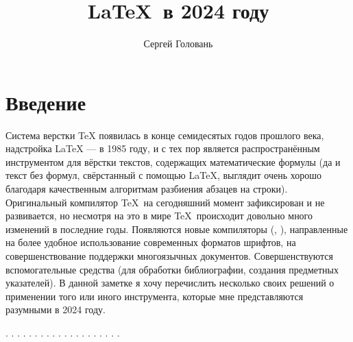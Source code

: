 \documentclass[a4paper,12pt,hyphens]{article}
\title{\LaTeX\ в 2024 году}
\author{Сергей Головань}
\begin{document}
%
\vspace{-\baselineskip}%
\maketitle
{}%
\vspace{-\baselineskip}%
\tableofcontents

\clearpage
\section{Введение}
Система верстки \TeX{} появилась в конце семидесятых годов прошлого века,
надстройка \LaTeX{} --- в 1985 году, и с тех пор является распространённым
инструментом для вёрстки текстов, содержащих математические формулы (да и текст
без формул, свёрстанный с помощью \LaTeX, выглядит очень хорошо благодаря
качественным алгоритмам разбиения абзацев на строки). Оригинальный компилятор
\TeX\ на сегодняшний момент зафиксирован и не развивается, но несмотря на это
в мире \TeX\ происходит довольно много изменений в последние годы. Появляются
новые компиляторы (\XeTeX{}, \LuaTeX{}), направленные
на более удобное использование
современных форматов шрифтов, на совершенствование поддержки многоязычных
документов. Совершенствуются вспомогательные средства (для обработки
библиографии, создания предметных указателей). В данной заметке я хочу
перечислить несколько своих решений о применении того или иного инструмента,
которые мне представляются разумными в 2024 году.

\parencite{evgrafov-evgrafov:1993}.
\parencite{spivak:1993}.
\parencite{knuth:1993}.
\parencite{knuth:2003a}.
\parencite{knuth:2003b}.
\parencite{gratzer:2000}.
\parencite{gussens-mittelbach-samarin:1999}.
\parencite{gussens-ratz-mittelbach:2002}.
\parencite{gussens-ratz:2001}.
\parencite{rozhenko:2005}.
\parencite{baldin:2008}.
\parencite{lvovskiy:2014}.
\parencite{kotelnikov-chebotaev:2016}.
\parencite{belyakov-palosh-sadovskiy:2012}.
\parencite{morozov-parhomenko:2011}.
\parencite{kottwitz:2022}.
\parencite{stolyarov:2010}.
\parencite{kuznetsov:2021}.
\parencite{vorontsov:2005}.
\parencite{lamport:1994}.
\end{document}
